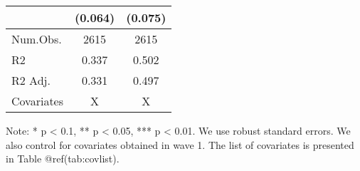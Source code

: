 \begin{table}
\begin{threeparttable}
\begin{tabular}[t]{lcc}
 & (\num{0.064}) & (\num{0.075})\\
\midrule
Num.Obs. & \num{2615} & \num{2615}\\
R2 & \num{0.337} & \num{0.502}\\
R2 Adj. & \num{0.331} & \num{0.497}\\
Covariates & X & X\\
\bottomrule
\end{tabular}
\begin{tablenotes}
\item Note: * p < 0.1, ** p < 0.05, *** p < 0.01. We use robust standard errors. We also control for covariates obtained in wave 1. The list of covariates is presented in Table @ref(tab:covlist).
\end{tablenotes}
\end{threeparttable}
\end{table}
